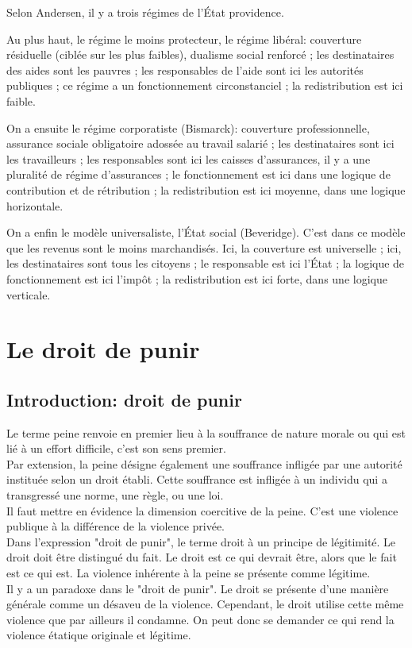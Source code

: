 \documentclass[10pt, a4paper, openany]{book}
\begin{document}
Selon Andersen, il y a trois régimes de l'État providence.


Au plus haut, le régime le moins protecteur, le régime libéral: couverture résiduelle (ciblée sur les plus faibles), dualisme social renforcé ; les destinataires des aides sont les pauvres ; les responsables de l'aide sont ici les autorités publiques ; ce régime a un fonctionnement circonstanciel ; la redistribution est ici faible. 


On a ensuite le régime corporatiste (Bismarck): couverture professionnelle, assurance sociale obligatoire adossée au travail salarié ; les destinataires sont ici les travailleurs ; les responsables sont ici les caisses d'assurances, il y a une pluralité de régime d'assurances ; le fonctionnement est ici dans une logique de contribution et de rétribution ; la redistribution est ici moyenne, dans une logique horizontale.


On a enfin le modèle universaliste, l'État social (Beveridge). C'est dans ce modèle que les revenus sont le moins marchandisés. Ici, la couverture est universelle ; ici, les destinataires sont tous les citoyens ; le responsable est ici l'État ; la logique de fonctionnement est ici l'impôt ; la redistribution est ici forte, dans une logique verticale. 

\chapter{Le droit de punir}

\section{Introduction: droit de punir}

Le terme peine renvoie en premier lieu à la souffrance de nature morale ou qui est lié à un effort difficile, c'est son sens premier. \\
Par extension, la peine désigne également une souffrance infligée par une autorité instituée selon un droit établi. Cette souffrance est infligée à un individu qui a transgressé une norme, une règle, ou une loi. \\
Il faut mettre en évidence la dimension coercitive de la peine. C'est une violence publique à la différence de la violence privée. \\
Dans l'expression "droit de punir", le terme droit à un principe de légitimité. Le droit doit être distingué du fait. Le droit est ce qui devrait être, alors que le fait est ce qui est. La violence inhérente à la peine se présente comme légitime. \\
Il y a un paradoxe dans le "droit de punir". Le droit se présente d'une manière générale comme un désaveu de la violence. Cependant, le droit utilise cette même violence que par ailleurs il condamne. On peut donc se demander ce qui rend la violence étatique originale et légitime. 
\end{document}
